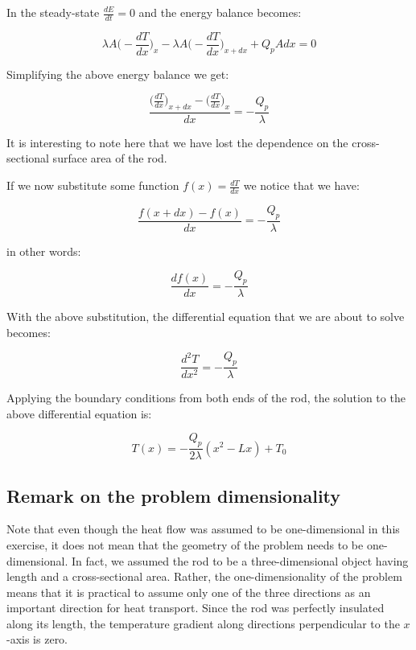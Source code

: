 \documentclass[20pt]{report}
\begin{document}
In the steady-state $\frac{dE}{dt} = 0$ and the energy balance becomes:

\begin{equation}
\lambda A \Big(- \frac{dT}{dx} \Big)_x - \lambda A \Big(- \frac{dT}{dx} \Big)_{x + dx} + Q_p A dx = 0
\end{equation}

Simplifying the above energy balance we get:

\begin{equation*}
\frac{\Big(\frac{dT}{dx} \Big)_{x + dx} - \Big(\frac{dT}{dx} \Big)_x  }{dx} = - \frac{Q_p}{\lambda}
\end{equation*}

It is interesting to note here that we have lost the dependence on the cross-sectional surface area of the rod.

If we now substitute some function $f(x) = \frac{dT}{dx}$ we notice that we have:

\begin{equation*}
\frac{f(x + dx) - f(x)}{dx} = - \frac{Q_p}{\lambda}
\end{equation*}

in other words:

\begin{equation}
\frac{df(x)}{dx} = - \frac{Q_p}{\lambda}
\end{equation}

With the above substitution, the differential equation that we are about to solve becomes:

\begin{equation}
\frac{d^2T}{dx^2} = - \frac{Q_p}{\lambda}
\end{equation}

Applying the boundary conditions from both ends of the rod, the solution to the above differential equation is:

\begin{equation}
T(x) = - \frac{Q_p}{2 \lambda} (x^2 - Lx) + T_0
\label{eq:solution}
\end{equation}

\subsection*{Remark on the problem dimensionality}

Note that even though the heat flow was assumed to be one-dimensional in this exercise, it does not mean that the geometry of the problem needs to be one-dimensional. In fact, we assumed the rod to be a three-dimensional object having length and a cross-sectional area. Rather, the one-dimensionality of the problem means that it is practical to assume only one of the three directions as an important direction for heat transport. Since the rod was perfectly insulated along its length, the temperature gradient along directions perpendicular to the $x$-axis is zero.
\end{document}
